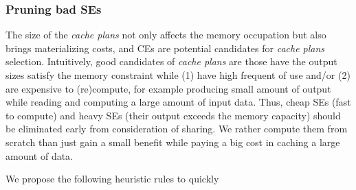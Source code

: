 

\subsubsection{Pruning bad SEs}
\label{sec:se-prune}
The size of the \emph{cache plans} not only affects the memory occupation but also brings materializing costs, and CEs are potential candidates for \emph{cache plans} selection. Intuitively, good candidates of \emph{cache plans} are those have the output sizes satisfy the memory constraint while (1) have high frequent of use and/or (2) are expensive to (re)compute, for example producing small amount of output while reading and computing a large amount of input data. Thus, cheap SEs (fast to compute) and heavy SEs (their output exceeds the memory capacity) should be eliminated early from consideration of sharing. We rather compute them from scratch than just gain a small benefit while paying a big cost in caching a large amount of data.

We propose the following heuristic rules to quickly 





